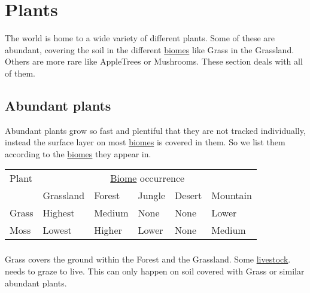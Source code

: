 \section{Plants}\label{ch:World:Plants}

The world is home to a wide variety of different plants. Some of these are
abundant, covering the soil in the different \hyperref[ch:World:Biomes]{biomes}
like \gls{Grass} in the \gls{Grassland}. Others are more rare like
\glspl{AppleTree} or \glspl{Mushroom}. These section deals with all of them.

\subsection{Abundant plants}\label{ch:World:Plants:Abundant}

Abundant plants grow so fast and plentiful that they are not tracked
individually, instead the surface layer on most
\hyperref[ch:World:Biomes]{biomes} is covered in them. So we list them
according to the \hyperref[ch:World:Biomes]{biomes} they appear in.

\begin{longtable}{llllll}
	\toprule
	Plant       & \multicolumn{5}{c}{\hyperref[ch:World:Biomes]{Biome} occurrence}                                                               \\
	            & \Gls{Grassland}                                                  & \Gls{Forest} & \Gls{Jungle} & \Gls{Desert} & \Gls{Mountain} \\
	\midrule
	\Gls{Grass} & Highest                                                          & Medium       & None         & None         & Lower          \\
	\Gls{Moss}  & Lowest                                                           & Higher       & Lower        & None         & Medium         \\
	\bottomrule
\end{longtable}

\subsubsection{}

\Gls*{Grass} covers the ground within the \gls{Forest} and the \gls{Grassland}.
Some \hyperref[ch:World:Inhabitants:Livestock]{livestock}.
needs to graze to live. This can only happen on soil covered with \gls{Grass} or similar abundant plants.

\subsubsection{}

